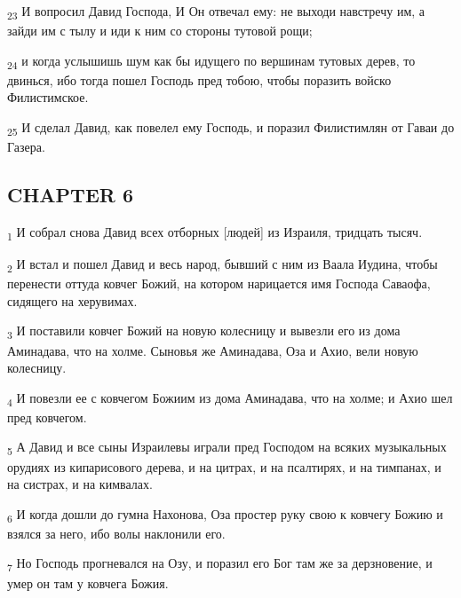 \begin{tcolorbox}
\textsubscript{23} И вопросил Давид Господа, И Он отвечал ему: не выходи навстречу им, а зайди им с тылу и иди к ним со стороны тутовой рощи;
\end{tcolorbox}
\begin{tcolorbox}
\textsubscript{24} и когда услышишь шум как бы идущего по вершинам тутовых дерев, то двинься, ибо тогда пошел Господь пред тобою, чтобы поразить войско Филистимское.
\end{tcolorbox}
\begin{tcolorbox}
\textsubscript{25} И сделал Давид, как повелел ему Господь, и поразил Филистимлян от Гаваи до Газера.
\end{tcolorbox}
\subsection{CHAPTER 6}
\begin{tcolorbox}
\textsubscript{1} И собрал снова Давид всех отборных [людей] из Израиля, тридцать тысяч.
\end{tcolorbox}
\begin{tcolorbox}
\textsubscript{2} И встал и пошел Давид и весь народ, бывший с ним из Ваала Иудина, чтобы перенести оттуда ковчег Божий, на котором нарицается имя Господа Саваофа, сидящего на херувимах.
\end{tcolorbox}
\begin{tcolorbox}
\textsubscript{3} И поставили ковчег Божий на новую колесницу и вывезли его из дома Аминадава, что на холме. Сыновья же Аминадава, Оза и Ахио, вели новую колесницу.
\end{tcolorbox}
\begin{tcolorbox}
\textsubscript{4} И повезли ее с ковчегом Божиим из дома Аминадава, что на холме; и Ахио шел пред ковчегом.
\end{tcolorbox}
\begin{tcolorbox}
\textsubscript{5} А Давид и все сыны Израилевы играли пред Господом на всяких музыкальных орудиях из кипарисового дерева, и на цитрах, и на псалтирях, и на тимпанах, и на систрах, и на кимвалах.
\end{tcolorbox}
\begin{tcolorbox}
\textsubscript{6} И когда дошли до гумна Нахонова, Оза простер руку свою к ковчегу Божию и взялся за него, ибо волы наклонили его.
\end{tcolorbox}
\begin{tcolorbox}
\textsubscript{7} Но Господь прогневался на Озу, и поразил его Бог там же за дерзновение, и умер он там у ковчега Божия.
\end{tcolorbox}

